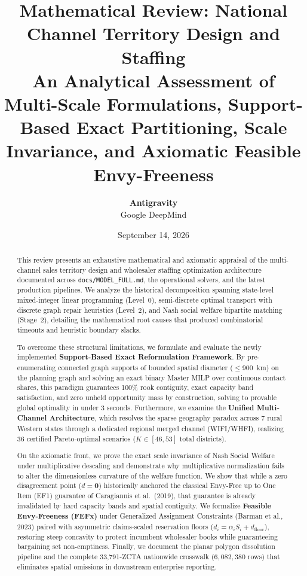 \documentclass[11pt,a4paper]{article}
\title{\textbf{Mathematical Review: National Channel Territory Design and Staffing}\\[0.4ex]
\large An Analytical Assessment of Multi-Scale Formulations, Support-Based Exact Partitioning, Scale Invariance, and Axiomatic Feasible Envy-Freeness}
\author{\textbf{Antigravity} \\ Google DeepMind}
\date{September 14, 2026}
\theoremstyle{plain}
\theoremstyle{definition}
\begin{document}
\maketitle

\begin{abstract}
This review presents an exhaustive mathematical and axiomatic appraisal of the multi-channel sales territory design and wholesaler staffing optimization architecture documented across \texttt{docs/MODEL\_FULL.md}, the operational solvers, and the latest production pipelines. We analyze the historical decomposition spanning state-level mixed-integer linear programming (Level~0), semi-discrete optimal transport with discrete graph repair heuristics (Level~2), and Nash social welfare bipartite matching (Stage~2), detailing the mathematical root causes that produced combinatorial timeouts and heuristic boundary slacks. 

To overcome these structural limitations, we formulate and evaluate the newly implemented \textbf{Support-Based Exact Reformulation Framework}. By pre-enumerating connected graph supports of bounded spatial diameter ($\le 900$~km) on the planning graph and solving an exact binary Master MILP over continuous contact shares, this paradigm guarantees 100\% rook contiguity, exact capacity band satisfaction, and zero unheld opportunity mass by construction, solving to provable global optimality in under 3 seconds. Furthermore, we examine the \textbf{Unified Multi-Channel Architecture}, which resolves the sparse geography paradox across 7 rural Western states through a dedicated regional merged channel (WIFI/WHFI), realizing 36 certified Pareto-optimal scenarios ($K \in [46, 53]$ total districts).

On the axiomatic front, we prove the exact scale invariance of Nash Social Welfare under multiplicative descaling and demonstrate why multiplicative normalization fails to alter the dimensionless curvature of the welfare function. We show that while a zero disagreement point ($d=\mathbf{0}$) historically anchored the classical Envy-Free up to One Item (EF1) guarantee of Caragiannis et al.~(2019), that guarantee is already invalidated by hard capacity bands and spatial contiguity. We formalize \textbf{Feasible Envy-Freeness (FEFx)} under Generalized Assignment Constraints (Barman et al., 2023) paired with asymmetric claims-scaled reservation floors ($d_i = \alpha_i S_i + d_{\text{floor}}$), restoring steep concavity to protect incumbent wholesaler books while guaranteeing bargaining set non-emptiness. Finally, we document the planar polygon dissolution pipeline and the complete 33,791-ZCTA nationwide crosswalk ($6,082,380$ rows) that eliminates spatial omissions in downstream enterprise reporting.
\end{abstract}
\end{document}
